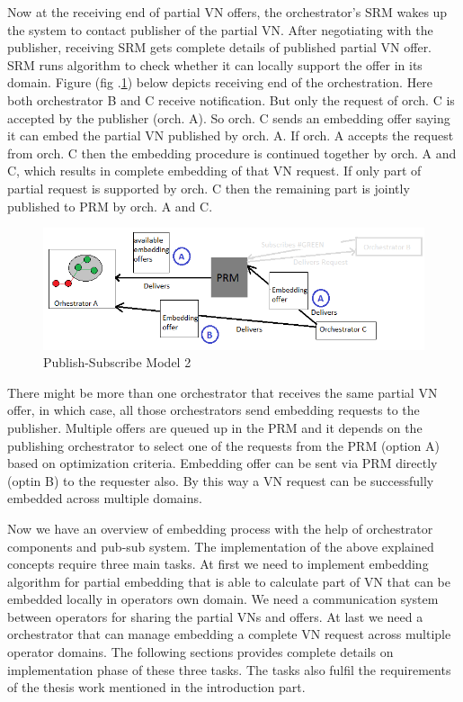 \documentclass[article,dr=phil,type=msc ,colorback,accentcolor=tud4b]{tudthesis}
\begin{document}
Now at the receiving end of partial VN offers,  the orchestrator's SRM wakes up the system to contact publisher of the partial VN. After negotiating with the publisher, receiving SRM gets complete details of published partial VN offer. SRM runs algorithm to check whether it can locally support the offer in its domain. Figure (fig .\ref{psm2}) below depicts receiving end of the orchestration. Here both orchestrator B and C receive notification. But only the request of orch. C is accepted by the publisher (orch. A). So orch. C sends an embedding offer saying it can embed the partial VN published by orch. A.
If orch. A accepts the request from orch. C then the embedding procedure is continued together by orch. A and C, which results in complete embedding of that VN request. If only part of partial request is supported by orch. C then the remaining part is jointly published to PRM by orch. A and C.\newline
\begin{figure}[h]
	\centering
	\includegraphics[width=\linewidth]{psm2.png}
	\caption{Publish-Subscribe Model 2}
	\label{psm2}
\end{figure}

There might be more than one orchestrator that receives the same partial VN offer, in which case, all those orchestrators send embedding requests to the publisher. Multiple offers are queued up in the PRM and it depends on the publishing orchestrator to select one of the requests from the PRM (option A) based on optimization criteria. Embedding offer can be sent via PRM directly (optin B) to the requester also. By this way a VN request can be successfully embedded across multiple domains.\newline



Now we have an overview of embedding process with the help of orchestrator components and pub-sub system. The implementation of the above explained concepts require three main tasks. At first we need to implement embedding algorithm for partial embedding that is able to calculate part of VN that can be embedded locally in operators own domain. We need a communication system between operators for sharing the partial VNs and offers. At last we need a orchestrator that can manage embedding a complete VN request across multiple operator domains. The following sections provides complete details on implementation phase of these three tasks. The tasks also fulfil the requirements of the thesis work mentioned in the introduction part.
\end{document}

